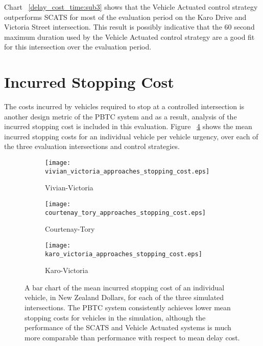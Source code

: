 Chart ~\ref{delay_cost_time:sub3} shows that the Vehicle Actuated control strategy outperforms SCATS for most of the evaluation period on the Karo Drive and Victoria Street intersection. This result is possibly indicative that the 60 second maximum duration used by the Vehicle Actuated control strategy are a good fit for this intersection over the evaluation period.

\section{Incurred Stopping Cost}
\label{sec:incurred_stopping_cost}

The costs incurred by vehicles required to stop at a controlled intersection is another design metric of the PBTC system and as a result, analysis of the incurred stopping cost is included in this evaluation. Figure ~\ref{eval:mean_stopping_cost} shows the mean incurred stopping costs for an individual vehicle per vehicle urgency, over each of the three evaluation intersections and control strategies. 

\begin{figure}
\centering
\begin{subfigure}{.5\textwidth}
  \centering
  \texttt{[image: vivian\_victoria\_approaches\_stopping\_cost.eps]}
  \caption{Vivian-Victoria}
  \label{mean_stopping_cost:sub1}
\end{subfigure}%
\begin{subfigure}{.5\textwidth}
  \centering
  \texttt{[image: courtenay\_tory\_approaches\_stopping\_cost.eps]}
  \caption{Courtenay-Tory}
  \label{mean_stopping_cost:sub2}
\end{subfigure}

\vspace{1cm}

\begin{subfigure}{.5\textwidth}
  \centering
  \texttt{[image: karo\_victoria\_approaches\_stopping\_cost.eps]}
  \caption{Karo-Victoria}
  \label{mean_stopping_cost:sub3}
\end{subfigure}%
\caption{ A bar chart of the mean incurred stopping cost of an individual vehicle, in New Zealand Dollars, for each of the three simulated intersections. The PBTC system consistently achieves lower mean stopping costs for vehicles in the simulation, although the performance of the SCATS and Vehicle Actuated systems is much more comparable than performance with respect to mean delay cost.   }
\label{eval:mean_stopping_cost}
\end{figure}

